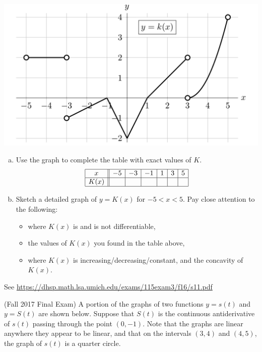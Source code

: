 \documentclass[11pt]{exam}
\begin{document}
\begin{questions}
	\vspace{-0.5em}
        \begin{center}
          \includegraphics[scale=0.45]{graphk}
        \end{center}
	\vspace{-2em}
	\begin{enumerate}[(a)]
		\item Use the graph to complete the table with exact values of $K$.
		$$\begin{array}{|c||c|c|c|c|c|c|c|}
	\hline
	x & -5 & -3 & -1 & 1 & 3 & 5 \\
	\hline
	K(x) & & & & & & \\
	\hline
	\end{array}$$
		\item Sketch a detailed graph of $y = K(x)$ for $-5 < x < 5$. Pay close attention to the following:
\begin{itemize}
	\item where $K(x)$ is and is not differentiable,
	\item the values of $K(x)$ you found in the table above,
	\item where $K(x)$ is increasing/decreasing/constant, and the concavity of $K(x)$.
\end{itemize}
	\end{enumerate}
        \begin{solution}
          See \href{https://dhsp.math.lsa.umich.edu/exams/115exam3/f16/s11.pdf}{https://dhsp.math.lsa.umich.edu/exams/115exam3/f16/s11.pdf}
        \end{solution}
        \pagebreak
\question (Fall 2017 Final Exam) 
	A portion of the graphs of two functions $y = s(t)$ and $y = S(t)$ are shown below. Suppose that $S(t)$ is the continuous antiderivative of $s(t)$ passing through the point $(0,-1)$. Note that the graphs are linear anywhere they appear to be linear, and that on the intervals $(3, 4)$ and $(4, 5)$, the graph of $s(t)$ is a quarter circle.\

\end{questions}
\end{document}
